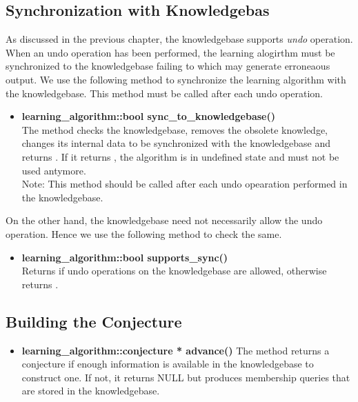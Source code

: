 \subsection*{Synchronization with Knowledgebas}

As discussed in the previous chapter, the knowledgebase supports \emph{undo} operation. When an undo operation has been performed, the learning alogirthm must be synchronized to the knowledgebase failing to which may generate erroneaous output. We use the following method to synchronize the learning algorithm with the knowledgebase. This method must be called after each undo operation.

\begin{itemize}

 \item \textbf{learning\_algorithm::bool sync\_to\_knowledgebase()} \\
	The method checks the knowledgebase, removes the obsolete knowledge, changes its internal data to be synchronized with the knowledgebase and returns \true. If it returns \false, the algorithm is in undefined state and must not be used antymore. \\
	Note: This method should be called after each undo opearation performed in the knowledgebase.

\end{itemize}

On the other hand, the knowledgebase need not necessarily allow the undo operation. Hence we use the following method to check the same.
\begin{itemize}
 
 \item \textbf{learning\_algorithm::bool supports\_sync()} \\
	 Returns \true if undo operations on the knowledgebase are allowed, otherwise returns \false.

\end{itemize}


\subsection*{Building the Conjecture}

\begin{itemize}
 \item \textbf{learning\_algorithm::conjecture * advance()} \vskip 1pt
	The method returns a conjecture if enough information is available in the knowledgebase to construct one. If not, it returns NULL but produces membership queries that are stored in the knowledgebase.
\end{itemize}

